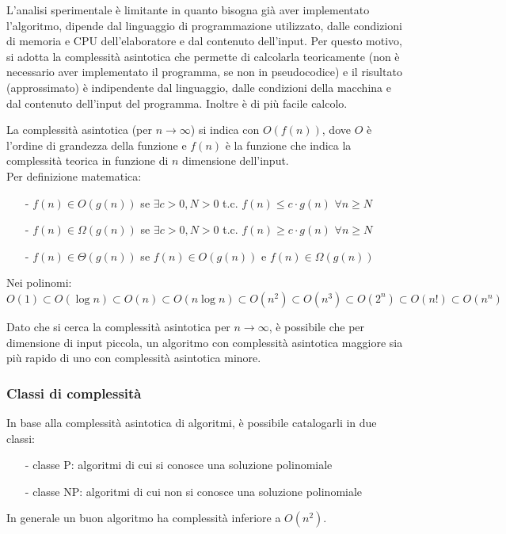 \documentclass{article}
\begin{document}
L'analisi sperimentale è limitante in quanto bisogna già aver implementato l'algoritmo, dipende dal linguaggio di programmazione
utilizzato, dalle condizioni di memoria e CPU dell'elaboratore e dal contenuto dell'input. Per questo motivo, si adotta la complessità
asintotica che permette di calcolarla teoricamente (non è necessario aver implementato il programma, se non in pseudocodice) e
il risultato (approssimato) è indipendente dal linguaggio, dalle condizioni della macchina e dal contenuto dell'input del programma.
Inoltre è di più facile calcolo.

La complessità asintotica (per \(n \to \infty\)) si indica con \(O(f(n))\), dove \(O\) è l'ordine di grandezza della funzione e
\(f(n)\) è la funzione che indica la complessità teorica in funzione di \(n\) dimensione dell'input. \\ Per definizione matematica:
\begin{itemize} [topsep=3pt, itemsep=0pt]
	\item[-] \(f(n) \in O(g(n))\) se \(\exists c > 0, N > 0\) t.c. \(f(n) \leq c \cdot g(n)\) \(\forall n \geq N\)
	\item[-] \(f(n) \in \Omega (g(n))\) se \(\exists c > 0, N > 0\) t.c. \(f(n) \geq c \cdot g(n)\) \(\forall n \geq N\)
	\item[-] \(f(n) \in \Theta (g(n))\) se \(f(n) \in O(g(n))\) e \(f(n) \in \Omega (g(n))\)
\end{itemize}

Nei polinomi: \(O(1) \subset O(\log n) \subset O(n) \subset O(n \log n) \subset O(n^2) \subset O(n^3) \subset O(2^n) \subset O(n!) \subset O(n^n)\)

Dato che si cerca la complessità asintotica per \(n \to \infty\), è possibile che per dimensione di input piccola, un algoritmo
con complessità asintotica maggiore sia più rapido di uno con complessità asintotica minore.

\subsubsection*{Classi di complessità}
In base alla complessità asintotica di algoritmi, è possibile catalogarli in due classi:
\begin{itemize} [topsep=3pt, itemsep=0pt]
	\item[-] classe P: algoritmi di cui si conosce una soluzione polinomiale
	\item[-] classe NP: algoritmi di cui non si conosce una soluzione polinomiale
\end{itemize}
In generale un buon algoritmo ha complessità inferiore a \(O(n^2)\).
\end{document}
